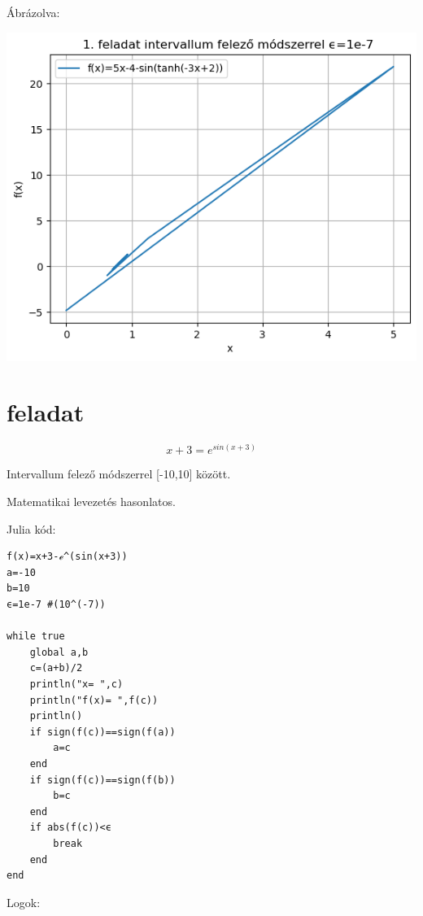 \documentclass{article}
\begin{document}
Ábrázolva:

\includegraphics[scale=1]{../plot_2.png} 

\section{feladat}

\begin{equation}
x+3= e^{sin(x+3)}
\end{equation}

Intervallum felező módszerrel [-10,10] között.

Matematikai levezetés hasonlatos.

Julia kód:

\begin{verbatim}
f(x)=x+3-ℯ^(sin(x+3))
a=-10
b=10
ϵ=1e-7 #(10^(-7))

while true
    global a,b
    c=(a+b)/2
    println("x= ",c)
    println("f(x)= ",f(c))
    println()
    if sign(f(c))==sign(f(a))
        a=c
    end
    if sign(f(c))==sign(f(b))
        b=c
    end
    if abs(f(c))<ϵ
        break
    end
end
\end{verbatim}

Logok:
\end{document}
